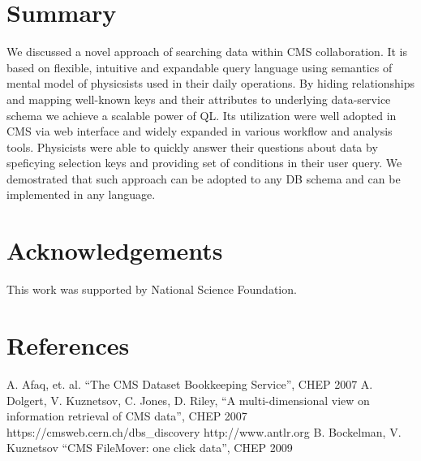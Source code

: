 \documentclass[a4paper]{jpconf}
\begin{document}
\section{Summary}
We discussed a novel approach of searching data within CMS
collaboration. It is based on flexible,
intuitive and expandable query language using
semantics of mental model of physicsists used in their 
daily operations.
By hiding relationships and mapping well-known
keys and their attributes to underlying data-service
schema we achieve a scalable power of QL. Its utilization
were well adopted in CMS via web interface and widely
expanded in various workflow and analysis tools. Physicists
were able to quickly answer their questions about data by
speficying selection keys and providing set of conditions
in their user query. We demostrated that such approach
can be adopted to any DB schema and can be implemented
in any language.

\section{Acknowledgements}

This work was supported by National Science Foundation.

\section*{References}
\begin{thebibliography}{9}
 A. Afaq, et. al. ``The CMS Dataset Bookkeeping Service'', CHEP 2007 
 A. Dolgert, V. Kuznetsov, C. Jones, D. Riley, 
``A multi-dimensional view on information retrieval of CMS data'', CHEP 2007
 https://cmsweb.cern.ch/dbs\_discovery
 http://www.antlr.org
 B. Bockelman, V. Kuznetsov ``CMS FileMover: one click data'', CHEP 2009

\end{thebibliography}
\end{document}
